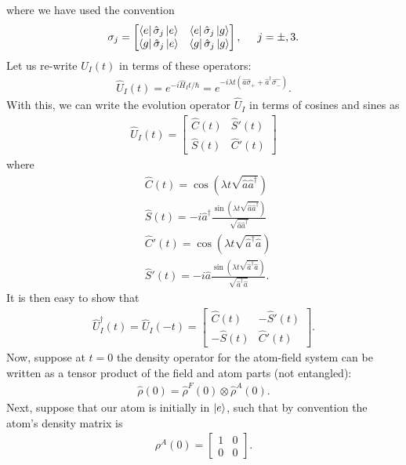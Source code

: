 \documentclass{book}
\theoremstyle{definition}
\newcommand{\f}[2]{\frac{#1}{#2}}
\begin{document}
where we have used the convention
\begin{align}
\sigma_j = \begin{bmatrix}
\bra{e}\hat{\sigma}_j\ket{e} & \bra{e}\hat{\sigma}_j\ket{g}\\
\bra{g}\hat{\sigma}_j\ket{e} &
\bra{g}\hat{\sigma}_j\ket{g} 
\end{bmatrix}, \hspace{0.5cm} j = \pm, 3.
\end{align}
Let us re-write $\hat{U}_I(t)$ in terms of these operators:
\begin{align}
\hat{U}_I(t) = e^{-i\hat{H}_I t/\hbar} = e^{-i\lambda t (\hat{a}\hat{\sigma}_+ + \hat{a}^\dagger\hat{\sigma_-})}.
\end{align}
With this, we can write the evolution operator $\hat{U}_I$ in terms of cosines and sines as
\begin{align}
\hat{U}_I(t) = \begin{bmatrix}
\hat{C}(t) & \hat{S}'(t) \\ \hat{S}(t) & \hat{C}'(t)
\end{bmatrix}
\end{align}
where
\begin{align}
&\hat{C}(t) = \cos(\lambda t \sqrt{\hat{a}\hat{a}^\dagger})\\
&\hat{S}(t) = -i\hat{a}^\dagger\f{\sin(\lambda t \sqrt{\hat{a}\hat{a}^\dagger})}{\sqrt{\hat{a}\hat{a}^\dagger}}\\
&\hat{C}'(t) = \cos(\lambda t \sqrt{\hat{a}^\dagger\hat{a}})\\
&\hat{S}'(t) =  -i\hat{a}\f{\sin(\lambda t \sqrt{\hat{a}^\dagger\hat{a}})}{\sqrt{\hat{a}^\dagger\hat{a}}}.
\end{align}
It is then easy to show that
\begin{align}
\hat{U}^\dagger_I(t) = \hat{U}_I(-t) = \begin{bmatrix}
\hat{C}(t) & -\hat{S}'(t) \\ -\hat{S}(t) & \hat{C}'(t)
\end{bmatrix}.
\end{align}
Now, suppose at $t=0$ the density operator for the atom-field system can be written as a tensor product of the field and atom parts (not entangled):
\begin{align}
\hat{\rho}(0) = \hat{\rho}^F(0)\otimes \hat{\rho}^A(0).
\end{align}
Next, suppose that our atom is initially in $\ket{e}$, such that by convention the atom's density matrix is
\begin{align}
\rho^A(0) = \begin{bmatrix}
1 & 0 \\ 0 & 0
\end{bmatrix}.
\end{align}
\end{document}

